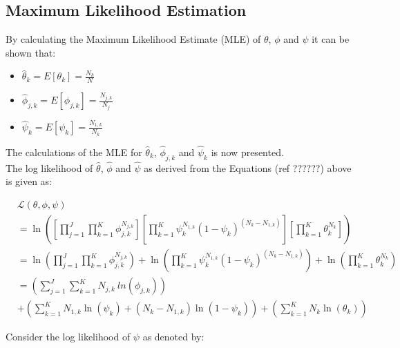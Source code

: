 \subsection{Maximum Likelihood Estimation}
\label{sec:bhh:optimisation:mle}

By calculating the Maximum Likelihood Estimate (MLE) of $\theta$, $\phi$ and $\psi$ it can be shown that:

\begin{itemize}
    \item $\hat{\theta}_{k} = E[\theta_{k}] = \frac{N_{k}}{N}$
    \item $\hat{\phi}_{j,k} = E[\phi_{j,k}] = \frac{N_{j,k}}{N_{j}}$
    \item $\hat{\psi}_{k} = E[\psi_{k}] = \frac{N_{1,k}}{N_{k}}$
\end{itemize}

The calculations of the MLE for $\hat{\theta}_{k}$, $\hat{\phi}_{j,k}$ and
$\hat{\psi}_{k}$ is now presented.\\
The log likelihood of $\hat{\theta}$, $\hat{\phi}$ and $\hat{\psi}$ as derived
from the Equations (ref ??????) above is given as:

\begin{equation}
    \begin{split}
        & \mathcal{L}(\theta, \phi, \psi) \\
        &= \ln\left(\left[ \prod_{j=1}^{J} \prod_{k=1}^{K} \phi_{j,k}^{N_{j,k}} \right] \left[ \prod_{k=1}^{K} \psi_{k}^{N_{1,k}} (1 - \psi_{k})^{(N_{k} - N_{1,k})} \right] \left[ \prod_{k=1}^{K} \theta_{k}^{N_{k}} \right] \right) \\
        &= \ln \left( \prod_{j=1}^{J} \prod_{k=1}^{K} \phi_{j,k}^{N_{j,k}} \right) +  \ln \left( \prod_{k=1}^{K} \psi_{k}^{N_{1,k}} (1 - \psi_{k})^{(N_{k} - N_{1,k})} \right) + \ln \left( \prod_{k=1}^{K} \theta_{k}^{N_{k}} \right) \\		
        &= \left( \sum_{j=1}^{J} \sum_{k=1}^{K} N_{j,k} \ ln \left( \phi_{j,k}
        \right) \right) \\
        &+ \left( \sum_{k=1}^{K} N_{1,k} \ln \left( \psi_{k} \right) + \left( N_{k} - N_{1,k} \right) \ln \left( 1 - \psi_{k} \right) \right) + \left( \sum_{k=1}^{K} N_{k} \ln \left( \theta_{k} \right) \right)
    \end{split}
\end{equation}

Consider the log likelihood of $\psi$  as denoted by:

